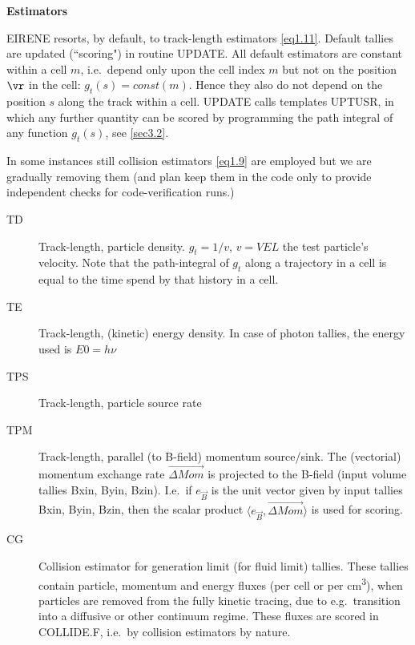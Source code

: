 \begin{landscape}
  \bigskip

  \textbf{Estimators}

  EIRENE resorts, by default, to track-length estimators \cref{eq1.11}.
  Default tallies are updated (``scoring") in routine UPDATE.
  All default estimators are constant within a cell $m$, i.e.\ depend only upon
  the cell index $m$ but not on the position $\vr$ in the cell: $g_t(s) =
    const(m)$.
  Hence they also do not depend on the position $s$ along the track within a
  cell.
  UPDATE calls templates UPTUSR, in which any further quantity can be scored by
  programming the path integral of any function $g_t(s)$, see \cref{sec3.2}.

  In some instances still collision estimators \cref{eq1.9} are employed but we
  are gradually removing them (and plan keep them in the code only to provide
  independent checks for code-verification runs.)
  \begin{description}
    \item[TD] Track-length, particle density.
          $g_t= 1/v$, $v=VEL$ the test particle's velocity.
          Note that the path-integral of $g_t$ along a trajectory in a cell is equal to
          the time spend by that history in a cell.
    \item[TE] Track-length, (kinetic) energy density.
          In case of photon tallies, the energy used is $E0 = h\nu$
    \item[TPS] Track-length, particle source rate
    \item[TPM] Track-length, parallel (to
          B-field) momentum source/sink.
          The (vectorial) momentum exchange rate $\vec{\Delta Mom}$ is projected to the
          B-field (input volume tallies Bxin, Byin, Bzin).
          I.e.\ if $e_{\vec B}$ is the unit vector given by input tallies Bxin, Byin,
          Bzin, then the scalar product $\langle e_{\vec B}, \vec{\Delta Mom}\rangle$ is
          used for scoring.
    \item[CG] Collision estimator for generation limit (for fluid limit) tallies.
          These tallies contain particle, momentum and energy fluxes (per cell or per
          \si{\cubic\centi\metre}), when particles are removed from the fully kinetic
          tracing, due to e.g.\ transition into a diffusive or other continuum regime.
          These fluxes are scored in COLLIDE.F, i.e.\ by collision estimators by nature.
  \end{description}

  \newpage


\end{landscape}
